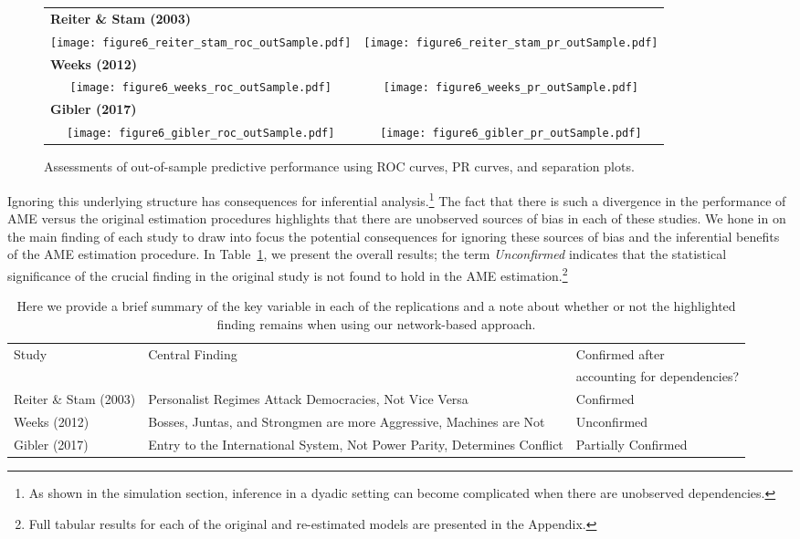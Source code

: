 \documentclass[12pt]{amsart}
\begin{document}
\begin{figure}
	\centering
	\begin{tabular}{cc}
		\multicolumn{2}{l}{\textbf{\tiny{Reiter \& Stam (2003)}}} \\
		\texttt{[image: figure6\_reiter\_stam\_roc\_outSample.pdf]} &
		\texttt{[image: figure6\_reiter\_stam\_pr\_outSample.pdf]} \\
		\multicolumn{2}{l}{\textbf{\tiny{Weeks (2012)}}} \\
		\texttt{[image: figure6\_weeks\_roc\_outSample.pdf]} &
		\texttt{[image: figure6\_weeks\_pr\_outSample.pdf]} \\
		\multicolumn{2}{l}{\textbf{\tiny{Gibler (2017)}}} \\
		\texttt{[image: figure6\_gibler\_roc\_outSample.pdf]} &
		\texttt{[image: figure6\_gibler\_pr\_outSample.pdf]} \\
	\end{tabular}
	\caption{Assessments of out-of-sample predictive performance using ROC curves, PR curves, and separation plots.}
	\label{fig:perf}
\end{figure}

Ignoring this underlying structure has consequences for inferential analysis.\footnote{As shown in the simulation section, inference in a dyadic setting can become complicated when there are unobserved dependencies.} The fact that there is such a divergence in the performance of AME versus the original estimation procedures highlights that there are unobserved sources of bias in each of these studies. We hone in on the main finding of each study to draw into focus the potential consequences for ignoring these sources of bias and the inferential benefits of the AME estimation procedure.  In Table~\ref{tab:modelFindingSumm}, we present the overall results; the term \textit{Unconfirmed} indicates that the statistical significance of the crucial finding in the original study is not found to hold in the AME estimation.\footnote{Full tabular results for each of the original and re-estimated models are presented in the Appendix.}

\begin{table}[ht]
\centering
\caption{Here we provide a brief summary of the key variable in each of the replications and a note about whether or not the highlighted finding remains when using our network-based approach.}
	\begin{tabular}{l p{6cm} l} \toprule
		\multirow{2}{*}{Study} & \multirow{2}{*}{Central Finding} &  Confirmed after \\
		& &  accounting for dependencies? \\ \toprule
		Reiter \& Stam (2003) & Personalist Regimes Attack Democracies, Not Vice Versa & {Confirmed} \\ \midrule
		Weeks (2012) & Bosses, Juntas, and Strongmen are more Aggressive, Machines are Not & {Unconfirmed} \\\midrule
		Gibler (2017) & Entry to the International System, Not Power Parity, Determines Conflict & {Partially Confirmed}\\ \bottomrule
	\end{tabular}
	\label{tab:modelFindingSumm}
\end{table}
\end{document}

